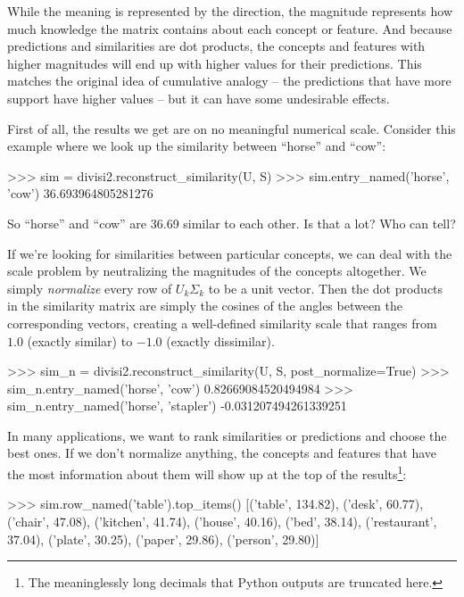 \documentclass[11pt]{article}
\begin{document}
While the meaning is represented by the direction, the magnitude represents how
much knowledge the matrix contains about each concept or feature. And because
predictions and similarities are dot products, the concepts and features with
higher magnitudes will end up with higher values for their predictions. This
matches the original idea of cumulative analogy -- the predictions that have
more support have higher values -- but it can have some undesirable effects.

First of all, the results we get are on no meaningful numerical scale. Consider
this example where we look up the similarity between ``horse'' and ``cow'':

\begin{python}
>>> sim = divisi2.reconstruct_similarity(U, S)
>>> sim.entry_named('horse', 'cow')
36.693964805281276
\end{python}

So ``horse'' and ``cow'' are 36.69 similar to each other. Is that a lot? Who
can tell?

If we're looking for similarities between particular concepts, we can deal with
the scale problem by neutralizing the magnitudes of the concepts altogether.
We simply {\em normalize} every row of $U_k \Sigma_k$ to be a unit vector.  Then
the dot products in the similarity matrix are simply the cosines of the angles
between the corresponding vectors, creating a well-defined similarity scale
that ranges from $1.0$ (exactly similar) to $-1.0$ (exactly dissimilar).

\begin{python}
>>> sim_n = divisi2.reconstruct_similarity(U, S, post_normalize=True)
>>> sim_n.entry_named('horse', 'cow')
0.82669084520494984
>>> sim_n.entry_named('horse', 'stapler')
-0.031207494261339251
\end{python}

In many applications, we want to rank similarities or predictions and choose
the best ones. If we don't normalize anything, the concepts and features that
have the most information about them will show up at the top of the results\footnote{The meaninglessly long decimals that Python outputs are truncated here.}:

\begin{python}
>>> sim.row_named('table').top_items()
[('table', 134.82), ('desk', 60.77), ('chair', 47.08), ('kitchen', 41.74),
('house', 40.16), ('bed', 38.14), ('restaurant', 37.04), ('plate', 30.25),
('paper', 29.86), ('person', 29.80)]
\end{python}
\end{document}
